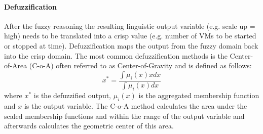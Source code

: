 \paragraph*{Defuzzification}
After the fuzzy reasoning the resulting linguistic output variable (e.g. scale up = high) needs to be translated into a crisp value (e.g. number of VMs to be started or stopped at time). Defuzzification maps the output from the fuzzy domain back into the crisp domain. The most common defuzzification methods is the Center-of-Area (C-o-A) often referred to as Center-of-Gravity and is defined as follows:
\begin{equation}
x^{*} = \frac{\int \mu_{i}(x) x dx}{\int \mu_{i}(x) dx}
\end{equation}
where $x^{*}$ is the defuzzified output, $\mu_{i}(x)$ is the aggregated membership function and $x$ is the output variable. The C-o-A method calculates the area under the scaled membership functions and within the range of the output variable and afterwards calculates the geometric center of this area.


